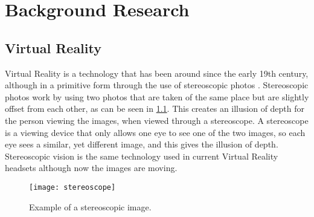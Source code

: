 \chapter{Background Research}
\label{chapter2}


\section{Virtual Reality}
	Virtual Reality is a technology that has been around since the early 19th century, although in a primitive form through the use of stereoscopic photos \cite{stereoscopy}. Stereoscopic photos work by using two photos that are taken of the same place but are slightly offset from each other, as can be seen in \ref{fig:stereoscope1}. This creates an illusion of depth for the person viewing the images, when viewed through a stereoscope. A stereoscope is a viewing device that only allows one eye to see one of the two images, so each eye sees a similar, yet different image, and this gives the illusion of depth. Stereoscopic vision is the same technology used in current Virtual Reality headsets although now the images are moving.

\begin{figure}[h]
	\texttt{[image: stereoscope]}
	\centering
	\caption{Example of a stereoscopic image. \cite{leedsstereoscopic}}
	\label{fig:stereoscope1}
\end{figure}

